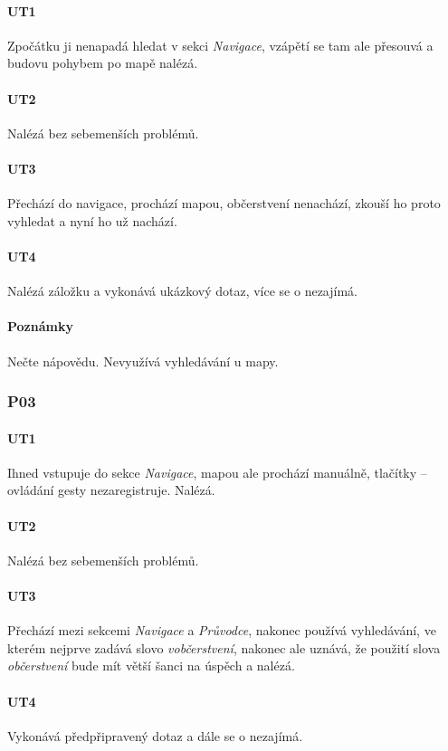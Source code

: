 \paragraph*{UT1}
Zpočátku ji nenapadá hledat v sekci \textit{Navigace}, vzápětí se tam ale přesouvá a budovu pohybem po mapě nalézá.
\paragraph*{UT2}
Nalézá bez sebemenších problémů.
\paragraph*{UT3}
Přechází do navigace, prochází mapou, občerstvení nenachází, zkouší ho proto vyhledat a nyní ho už nachází.
\paragraph*{UT4}
Nalézá záložku  a vykonává ukázkový dotaz, více se o  nezajímá.
\paragraph*{Poznámky}
Nečte nápovědu. Nevyužívá vyhledávání u mapy.

\subsubsection*{P03}
\paragraph*{UT1}
Ihned vstupuje do sekce \textit{Navigace}, mapou ale prochází manuálně, tlačítky -- ovládání gesty nezaregistruje. Nalézá.
\paragraph*{UT2}
Nalézá bez sebemenších problémů.
\paragraph*{UT3}
Přechází mezi sekcemi \textit{Navigace} a \textit{Průvodce}, nakonec používá vyhledávání, ve kterém nejprve zadává slovo \textit{vobčerstvení}, nakonec ale uznává, že použití slova \textit{občerstvení} bude mít větší šanci na úspěch a nalézá.
\paragraph*{UT4}
Vykonává předpřipravený dotaz a dále se o  nezajímá.

